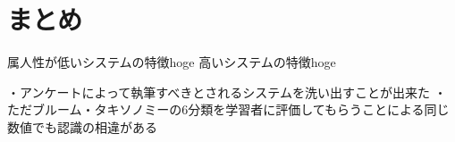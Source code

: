 \section{まとめ}
属人性が低いシステムの特徴hoge
高いシステムの特徴hoge


・アンケートによって執筆すべきとされるシステムを洗い出すことが出来た
・ただブルーム・タキソノミーの6分類を学習者に評価してもらうことによる同じ数値でも認識の相違がある




